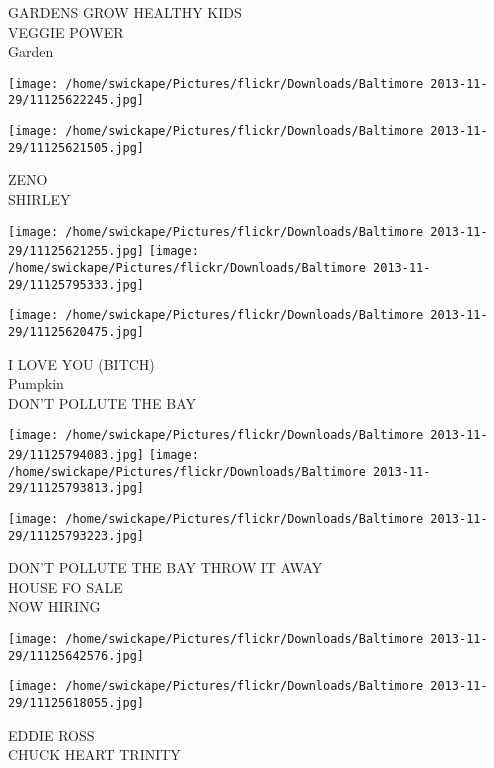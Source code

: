 \documentclass[10pt,letterpaper]{article}
\begin{document}
GARDENS GROW HEALTHY KIDS\\
VEGGIE POWER\\
Garden\\
\pagebreak

\texttt{[image: /home/swickape/Pictures/flickr/Downloads/Baltimore 2013-11-29/11125622245.jpg]}

\vspace{0.25in}
\texttt{[image: /home/swickape/Pictures/flickr/Downloads/Baltimore 2013-11-29/11125621505.jpg]}

ZENO\\
SHIRLEY\\
\pagebreak

\texttt{[image: /home/swickape/Pictures/flickr/Downloads/Baltimore 2013-11-29/11125621255.jpg]}
\texttt{[image: /home/swickape/Pictures/flickr/Downloads/Baltimore 2013-11-29/11125795333.jpg]}

\vspace{0.25in}
\texttt{[image: /home/swickape/Pictures/flickr/Downloads/Baltimore 2013-11-29/11125620475.jpg]}

I LOVE YOU (BITCH)\\
Pumpkin\\
DON'T POLLUTE THE BAY\\
\pagebreak

\texttt{[image: /home/swickape/Pictures/flickr/Downloads/Baltimore 2013-11-29/11125794083.jpg]}
\texttt{[image: /home/swickape/Pictures/flickr/Downloads/Baltimore 2013-11-29/11125793813.jpg]}

\texttt{[image: /home/swickape/Pictures/flickr/Downloads/Baltimore 2013-11-29/11125793223.jpg]}

DON'T POLLUTE THE BAY THROW IT AWAY\\
HOUSE FO SALE\\
NOW HIRING\\
\pagebreak

\texttt{[image: /home/swickape/Pictures/flickr/Downloads/Baltimore 2013-11-29/11125642576.jpg]}

\vspace{0.25in}
\texttt{[image: /home/swickape/Pictures/flickr/Downloads/Baltimore 2013-11-29/11125618055.jpg]}

EDDIE ROSS\\
CHUCK HEART TRINITY\\
\pagebreak
\end{document}
